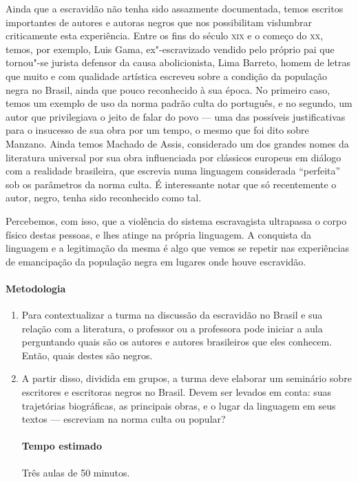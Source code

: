 \documentclass[11pt]{extarticle}
\begin{document}
\begin{enumerate}
\begin{enumerate}
Ainda que a escravidão não tenha sido assazmente documentada, temos escritos
importantes de autores e autoras negros que nos possibilitam vislumbrar criticamente
esta experiência. Entre os fins do século \textsc{xix} e o começo do \textsc{xx}, temos, por exemplo, Luis
Gama, ex"-escravizado vendido pelo próprio pai que tornou"-se jurista
defensor da causa abolicionista, Lima Barreto, homem de letras que muito e com qualidade
artística escreveu sobre a condição da população negra no Brasil, ainda que pouco reconhecido
à sua época. No primeiro caso, temos um exemplo de uso da norma padrão culta do português,
e no segundo, um autor que privilegiava o jeito de falar do povo --- uma das possíveis
justificativas para o insucesso de sua obra por um tempo, o mesmo que foi
dito sobre Manzano. Ainda temos Machado de Assis, considerado um dos grandes nomes
da literatura universal por sua obra influenciada por clássicos europeus em diálogo
com a realidade brasileira, que escrevia numa linguagem considerada ``perfeita''
sob os parâmetros da norma culta. É interessante notar que só recentemente
o autor, negro, tenha sido reconhecido como tal. 

Percebemos, com isso, que a violência do sistema escravagista ultrapassa o corpo
físico destas pessoas, e lhes atinge na própria linguagem. A conquista da linguagem
e a legitimação da mesma é algo que vemos se repetir nas experiências de emancipação da
população negra em lugares onde houve escravidão.

\paragraph{Metodologia}

\begin{enumerate}
  \item
  Para contextualizar a turma na discussão da escravidão no Brasil e sua relação com
  a literatura, o professor ou a professora pode iniciar a aula perguntando 
  quais são os autores e autores brasileiros que eles conhecem. Então, quais destes
  são negros.

  \item
  A partir disso, dividida em grupos, a turma deve elaborar um seminário sobre escritores
  e escritoras negros no Brasil. Devem ser levados em conta: suas trajetórias biográficas,
  as principais obras, e o lugar da linguagem em seus textos --- escreviam na norma culta
  ou popular? 

  \paragraph{Tempo estimado} Três aulas de 50 minutos.


\end{enumerate}
\end{enumerate}
\end{enumerate}
\end{document}
